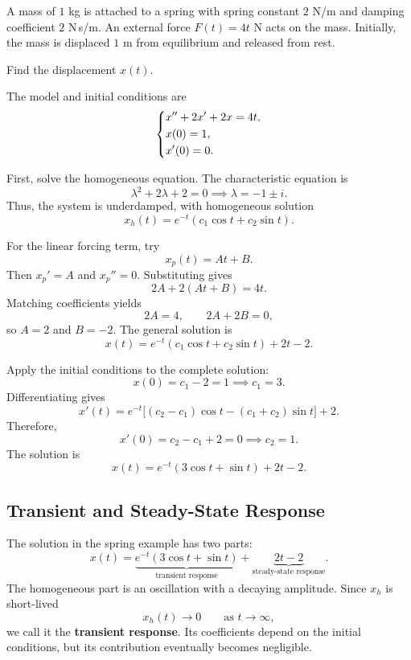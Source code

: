 \documentclass[10pt,letterpaper]{article}
\begin{document}
\begin{example}{
A mass of $1$ kg is attached to a spring with spring constant
$2$ N/m and damping coefficient $2$ N\,s/m. An external
force $F(t)=4t$ N acts on the mass. Initially, the mass is
displaced $1$ m from equilibrium and released from rest.

Find the displacement $x(t)$.
}
The model and initial conditions are
\[
\begin{dcases}
x''+2x'+2x=4t,\\
x(0)=1,\\
x'(0)=0.
\end{dcases}
\]

First, solve the homogeneous equation. The characteristic
equation is
\[
\lambda^2+2\lambda+2=0
\implies \lambda=-1\pm i.
\]
Thus, the system is underdamped, with homogeneous solution
\[
x_h(t)=e^{-t}(c_1\cos t+c_2\sin t).
\]

For the linear forcing term, try
\[
x_p(t)=At+B.
\]
Then $x_p'=A$ and $x_p''=0$. Substituting gives
\[
2A+2(At+B)=4t.
\]
Matching coefficients yields
\[
2A=4,\qquad 2A+2B=0,
\]
so $A=2$ and $B=-2$. The general solution is
\[
x(t)=e^{-t}(c_1\cos t+c_2\sin t)+2t-2.
\]

Apply the initial conditions to the complete solution:
\[
x(0)=c_1-2=1
\implies c_1=3.
\]
Differentiating gives
\[
x'(t)=e^{-t}
\bigl[(c_2-c_1)\cos t-(c_1+c_2)\sin t\bigr]+2.
\]
Therefore,
\[
x'(0)=c_2-c_1+2=0
\implies c_2=1.
\]
The solution is
\[
\boxed{x(t)=e^{-t}(3\cos t+\sin t)+2t-2.}
\]
\end{example}

\subsection{Transient and Steady-State Response}

The solution in the spring example has two parts:
\[
x(t)=
\underbrace{e^{-t}(3\cos t+\sin t)}_{\text{transient response}}
+
\underbrace{2t-2}_{\text{steady-state response}}.
\]
The homogeneous part is an oscillation with a decaying
amplitude. Since $x_h$ is short-lived
\[
x_h(t)\to0
\qquad\text{as }t\to\infty,
\]
we call it the \textbf{transient response}. Its coefficients
depend on the initial conditions, but its contribution
eventually becomes negligible.
\end{document}
